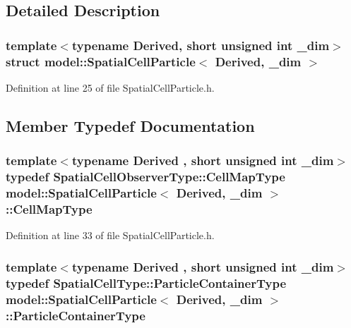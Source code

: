 \subsection{Detailed Description}
\subsubsection*{template$<$typename Derived, short unsigned int \+\_\+dim$>$struct model\+::\+Spatial\+Cell\+Particle$<$ Derived, \+\_\+dim $>$}



Definition at line 25 of file Spatial\+Cell\+Particle.\+h.



\subsection{Member Typedef Documentation}
\hypertarget{structmodel_1_1_spatial_cell_particle_ac41f685263028c4965edfcc89470e5f4}{}
\subsubsection[{Cell\+Map\+Type}]{\setlength{\rightskip}{0pt plus 5cm}template$<$typename Derived , short unsigned int \+\_\+dim$>$ typedef {\bf Spatial\+Cell\+Observer\+Type\+::\+Cell\+Map\+Type} {\bf model\+::\+Spatial\+Cell\+Particle}$<$ Derived, \+\_\+dim $>$\+::{\bf Cell\+Map\+Type}}\label{structmodel_1_1_spatial_cell_particle_ac41f685263028c4965edfcc89470e5f4}


Definition at line 33 of file Spatial\+Cell\+Particle.\+h.

\hypertarget{structmodel_1_1_spatial_cell_particle_a80a6bdd90fd793b044a49fc6886480d0}{}
\subsubsection[{Particle\+Container\+Type}]{\setlength{\rightskip}{0pt plus 5cm}template$<$typename Derived , short unsigned int \+\_\+dim$>$ typedef {\bf Spatial\+Cell\+Type\+::\+Particle\+Container\+Type} {\bf model\+::\+Spatial\+Cell\+Particle}$<$ Derived, \+\_\+dim $>$\+::{\bf Particle\+Container\+Type}}\label{structmodel_1_1_spatial_cell_particle_a80a6bdd90fd793b044a49fc6886480d0}



